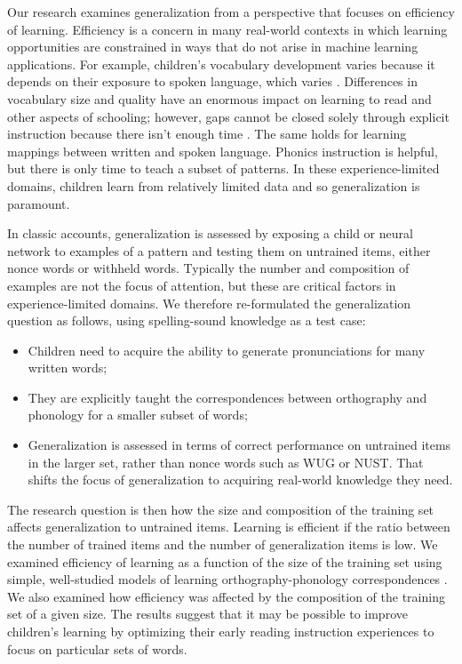 \documentclass[10pt,letterpaper]{article}
\newcommand{\exword}[1]{\MakeUppercase{#1}}
\begin{document}
Our research examines generalization from a perspective that focuses on efficiency of learning. Efficiency is a concern in many real-world contexts in which learning opportunities are constrained in ways that do not arise in machine learning applications. For example, children's vocabulary development varies because it depends on their exposure to spoken language, which varies \cite{Hart1995}.  Differences in vocabulary size and quality have an enormous impact on learning to read and other aspects of schooling;  however, gaps cannot be closed solely through explicit instruction because there isn't enough time \cite{Seidenberg2017}. The same holds for learning mappings between written and spoken language. Phonics instruction is helpful, but there is only time to teach a subset of patterns. In these experience-limited domains, children learn from relatively limited data and so generalization is paramount.

In classic accounts, generalization is assessed by exposing a child or neural network to examples of a pattern and testing them on untrained items, either nonce words or withheld words. Typically the number and composition of examples are not the focus of attention, but these are critical factors in experience-limited domains.  We therefore re-formulated the generalization question as follows, using spelling-sound knowledge as a test case: 

\begin{itemize}
	\item Children need to acquire the ability to generate pronunciations for many written words;  
	\item They are explicitly taught the correspondences between orthography and phonology for a smaller subset of words;
	\item Generalization is assessed in terms of correct performance on untrained items in the larger set, rather than nonce words such as \exword{wug} or \exword{nust}. That shifts the focus of generalization to acquiring real-world knowledge they need.
\end{itemize}

The research question is then how the size and composition of the training set affects generalization to untrained items. Learning is efficient if the ratio between the number of trained items and the number of generalization items is low. We examined efficiency of learning as a function of the size of the training set using simple, well-studied models of learning orthography-phonology correspondences \cite{Seidenberg1989,Seidenberg2014}. We also examined how efficiency was affected by the composition of the training set of a given size. The results suggest that it may be possible to improve children's learning by optimizing their early reading instruction experiences to focus on particular sets of words.
\end{document}
